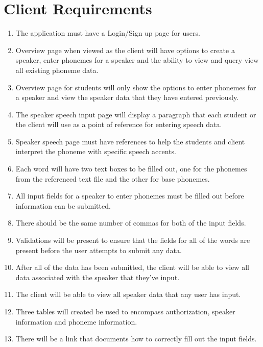 \documentclass[12pt, a4paper, oneside]{article}
\begin{document}
\section*{Client Requirements}
\begin{enumerate}
\item The application must have a Login/Sign up page for users.

\item Overview page when viewed as the client will have options to create a speaker, enter phonemes for a speaker and the ability to view and query view all existing phoneme data.

\item Overview page for students will only show the options to enter phonemes for a speaker and view the speaker data that they have entered previously.

\item The speaker speech input page will display a paragraph that each student or the client will use as a point of reference for entering speech data.

\item Speaker speech page must have references to help the students and client interpret the phoneme with specific speech accents.

\item Each word will have two text boxes to be filled out, one for the phonemes from the referenced text file and the other for base phonemes.

\item All input fields for a speaker to enter phonemes must be filled out before information can be submitted. 

\item There should be the same number of commas for both of the input fields.

\item Validations will be present to ensure that the fields for all of the words are present before the user attempts to submit any data. 

\item After all of the data has been submitted, the client will be able to view all data associated with the speaker that they’ve input.

\item The client will be able to view all speaker data that any user has input.

\item Three tables will created be used to encompass authorization, speaker information and phoneme information.

\item There will be a link that documents how to correctly fill out the input fields.
\end{enumerate}
\end{document}
